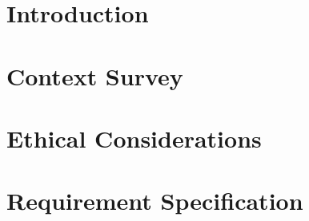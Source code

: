 \documentclass[
11pt, %
oneside, %
english, %
singlespacing, %
liststotoc, %
toctotoc, %
parskip, %
headsepline, %
]{MastersDoctoralThesis} %
\newcommand{\chapterinput}[1]{}
\newcommand{\appendixinput}[1]{}
\begin{document}
\appendixinput{abbreviations.tex}


\appendixinput{symbols.tex}


\appendixinput{constants.tex}




\mainmatter %

\pagestyle{thesis}


\chapter{Introduction}
\chapterinput{introduction.tex}

\chapter{Context Survey}
\chapterinput{context_survey.tex}

\chapter{Ethical Considerations}
\chapterinput{ethics.tex}

\chapter{Requirement Specification}
\chapterinput{requirements.tex}
\end{document}
